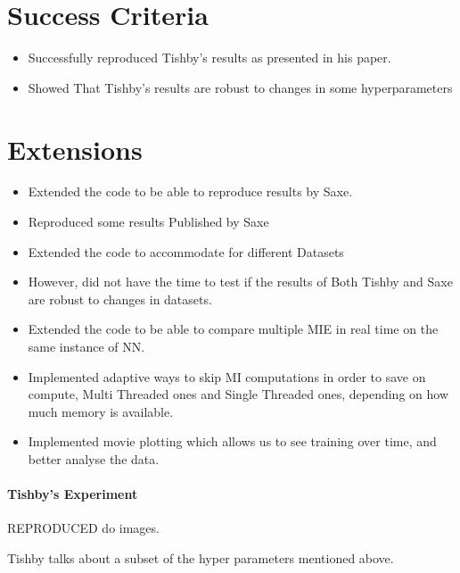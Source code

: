 \documentclass[dissertation.tex]{subfiles}
\begin{document}
\section{Success Criteria}

\begin{itemize}
  \item{
      Successfully reproduced Tishby's results as presented in his paper.
    }
  \item{
      Showed That Tishby's results are robust to changes in some hyperparameters
    }
\end{itemize}

\section{Extensions}

\begin{itemize}
  \item{
      Extended the code to be able to reproduce results by Saxe.
    }
  \item{
      Reproduced some results Published by Saxe
    }
  \item{
      Extended the code to accommodate for different Datasets
    }
  \item{
      However, did not have the time to test if the results of Both Tishby and
      Saxe are robust to changes in datasets.
    }
  \item{
      Extended the code to be able to compare multiple MIE in real time on the
      same instance of NN.
    }
  \item{
      Implemented adaptive ways to skip MI computations in order to save on
      compute, Multi Threaded ones and Single Threaded ones, depending on how
      much memory is available.
    }
  \item{
      Implemented movie plotting which allows us to see training over time, and
      better analyse the data.
    }
\end{itemize}

\paragraph{Tishby's Experiment} 

REPRODUCED do images.

Tishby\cite{TISBHY} talks about a subset of the hyper parameters mentioned
above. 
\end{document}

